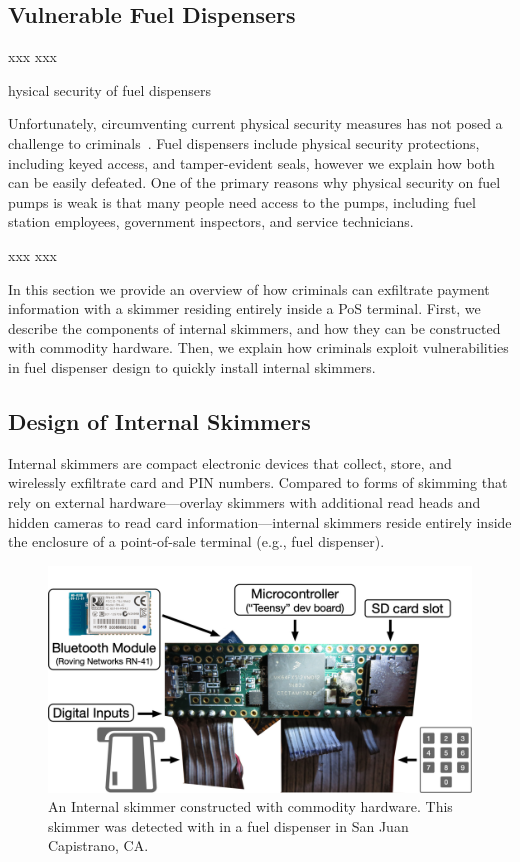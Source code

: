 \subsection{Vulnerable Fuel Dispensers}
\label{sec:bkgd-vuln}

xxx  xxx

hysical security of fuel dispensers 

Unfortunately, circumventing current physical security measures has not posed a challenge to criminals~\cite{ny-fuel-paymentdoor-access}.
%
Fuel dispensers include physical security protections, including keyed access,
and tamper-evident seals, however we explain how both can be easily defeated.
%
One of the primary reasons why physical security on fuel pumps is weak is that
many people need access to the pumps, including fuel station employees,
government inspectors, and service technicians.

xxx  xxx

In this section we provide an overview of how criminals can exfiltrate payment
information with a skimmer residing entirely inside a PoS terminal.
%
First, we describe the components of internal skimmers, and how they can
be constructed with commodity hardware.
%
Then, we explain how criminals exploit vulnerabilities in fuel dispenser design
to quickly install internal skimmers.

\subsection{Design of Internal Skimmers} %
\label{sec:background:design}

Internal skimmers are compact electronic devices that collect, store, and
wirelessly exfiltrate card and PIN numbers.
%
Compared to forms of skimming that rely on external hardware---overlay skimmers
with additional read heads and hidden cameras to read card
information---internal skimmers reside entirely inside the enclosure of a
point-of-sale terminal (e.g., fuel dispenser).

\begin{figure}
\centering
\includegraphics[width=0.95\linewidth]{fig/teensy_skimmer}
\caption{
\label{fig:intskimmer-construction}
An Internal skimmer constructed with commodity hardware. This skimmer
was detected with \bluetana in a fuel dispenser in San Juan Capistrano, CA.
}
\end{figure}


